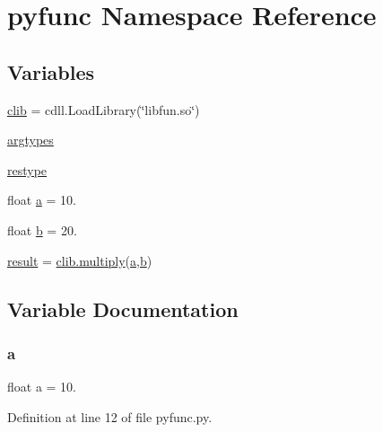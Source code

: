 \hypertarget{namespacepyfunc}{}\section{pyfunc Namespace Reference}
\label{namespacepyfunc}
\subsection*{Variables}
\begin{DoxyCompactItemize}
\item 
\mbox{\hyperlink{namespacepyfunc_ace4bf3f4d09963496adca6d8952c4d28}{clib}} = cdll.\+Load\+Library(\char`\"{}libfun.\+so\char`\"{})
\item 
\mbox{\hyperlink{namespacepyfunc_a4ad1eb96239eecf8f075ae4c92adab5e}{argtypes}}
\item 
\mbox{\hyperlink{namespacepyfunc_ab2283b4bbda0fbadaf5d9500e886ecbe}{restype}}
\item 
float \mbox{\hyperlink{namespacepyfunc_a4aec1a5be9d9a4a394a2e49e9744286e}{a}} = 10.
\item 
float \mbox{\hyperlink{namespacepyfunc_a83fc1af92e29717b4513d121b0c72c7d}{b}} = 20.
\item 
\mbox{\hyperlink{namespacepyfunc_a937d4dd628a8858b443a399410d2600b}{result}} = \mbox{\hyperlink{cfunc_8c_ac949e69d65ab7d1987f3dd728e6d259a}{clib.\+multiply}}(\mbox{\hyperlink{namespacepyfunc_a4aec1a5be9d9a4a394a2e49e9744286e}{a}},\mbox{\hyperlink{namespacepyfunc_a83fc1af92e29717b4513d121b0c72c7d}{b}})
\end{DoxyCompactItemize}


\subsection{Variable Documentation}
\mbox{\label{namespacepyfunc_a4aec1a5be9d9a4a394a2e49e9744286e}} 
\subsubsection{\texorpdfstring{a}{a}}
{\footnotesize\ttfamily float a = 10.}



Definition at line 12 of file pyfunc.\+py.

\mbox{\label{namespacepyfunc_a4ad1eb96239eecf8f075ae4c92adab5e}} 
